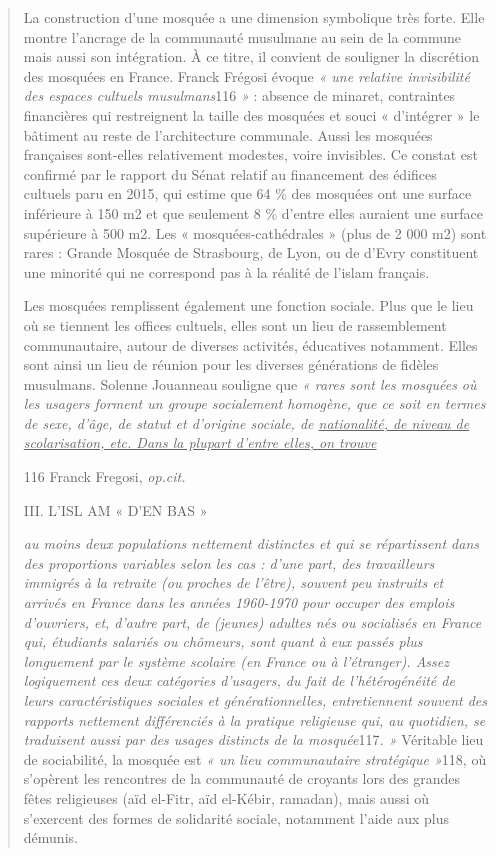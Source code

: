 \begin{quote}
La construction d'une mosquée a une dimension symbolique très forte.
Elle montre l'ancrage de la communauté musulmane au sein de la commune
mais aussi son intégration. À ce titre, il convient de souligner la
discrétion des mosquées en France. Franck Frégosi évoque \emph{« une
relative invisibilité des espaces cultuels musulmans}116 \emph{»} :
absence de minaret, contraintes financières qui restreignent la taille
des mosquées et souci « d'intégrer » le bâtiment au reste de
l'architecture communale. Aussi les mosquées françaises sont-elles
relativement modestes, voire invisibles. Ce constat est confirmé par le
rapport du Sénat relatif au financement des édifices cultuels paru en
2015, qui estime que 64 \% des mosquées ont une surface inférieure à 150
m2 et que seulement 8 \% d'entre elles auraient une surface supérieure à
500 m2. Les « mosquées-cathédrales » (plus de 2 000 m2) sont rares :
Grande Mosquée de Strasbourg, de Lyon, ou de d'Evry constituent une
minorité qui ne correspond pas à la réalité de l'islam français.

Les mosquées remplissent également une fonction sociale. Plus que le
lieu où se tiennent les offices cultuels, elles sont un lieu de
rassemblement communautaire, autour de diverses activités, éducatives
notamment. Elles sont ainsi un lieu de réunion pour les diverses
générations de fidèles musulmans. Solenne Jouanneau souligne que \emph{«
rares sont les mosquées où les usagers forment un groupe socialement
homogène, que ce soit en termes de sexe, d'âge, de statut et d'origine
sociale, de \underline{nationalité, de niveau de scolarisation, etc.
Dans la plupart d'entre elles, on trouve}}

116 Franck Fregosi, \emph{op.cit.}

III. L'ISL AM « D'EN BAS »

\emph{au moins deux populations nettement distinctes et qui se
répartissent dans des proportions variables selon les cas : d'une part,
des travailleurs immigrés à la retraite (ou proches de l'être), souvent
peu instruits et arrivés en France dans les années 1960-1970 pour
occuper des emplois d'ouvriers, et, d'autre part, de (jeunes) adultes
nés ou socialisés en France qui, étudiants salariés ou chômeurs, sont
quant à eux passés plus longuement par le système scolaire (en France ou
à l'étranger). Assez logiquement ces deux catégories d'usagers, du fait
de l'hétérogénéité de leurs caractéristiques sociales et
générationnelles, entretiennent souvent des rapports nettement
différenciés à la pratique religieuse qui, au quotidien, se traduisent
aussi par des usages distincts de la mosquée}117\emph{. »} Véritable
lieu de sociabilité, la mosquée est \emph{« un lieu communautaire
stratégique »}118, où s'opèrent les rencontres de la communauté de
croyants lors des grandes fêtes religieuses (aïd el-Fitr, aïd el-Kébir,
ramadan), mais aussi où s'exercent des formes de solidarité sociale,
notamment l'aide aux plus démunis.


\end{quote}
